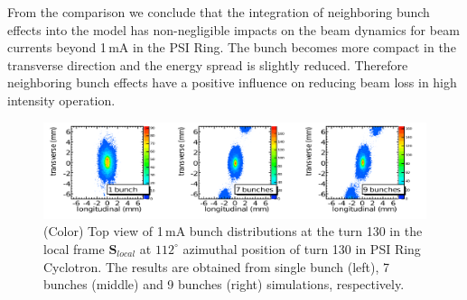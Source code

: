 \documentclass[aps,prstab,onecolumn,superscriptaddress,showpacs]{revtex4}
\newcommand{\bs}[1]{\mathbf #1}
\begin{document}


From the comparison we conclude that the integration of neighboring bunch effects into the model has non-negligible impacts on the beam dynamics for beam currents beyond 1\,mA in the PSI Ring. 
The bunch becomes more compact in the transverse direction and the energy spread is slightly reduced. 
Therefore neighboring bunch effects have a positive influence on reducing beam loss in high intensity operation.

\begin{figure}
  \includegraphics[width=1\linewidth]{figures/C9B7BSB-2D-1mA-130.pdf}
  \caption{(Color) Top view of 1\,mA bunch distributions at the turn 130  in the local frame ${\bs{S}_{local}}$ at $112^\circ$ azimuthal position of turn 130 in PSI Ring Cyclotron.
    The results are obtained from single bunch (left), 7 bunches (middle) and 9 bunches (right) simulations, respectively.}
  \label{fig:NBcompare2D}
\end{figure}
\end{document}
